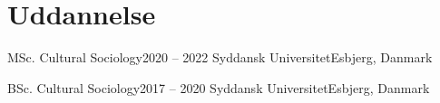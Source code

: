 \section{Uddannelse}
\mySubHeadingListStart

  \mySubHeading
    {MSc. Cultural Sociology}{2020 -- 2022}
    {Syddansk Universitet}{Esbjerg, Danmark}
    \myItemListStart
    \myItemListEnd

  \mySubHeading
    {BSc. Cultural Sociology}{2017 -- 2020}
    {Syddansk Universitet}{Esbjerg, Danmark}

\mySubHeadingListEnd
